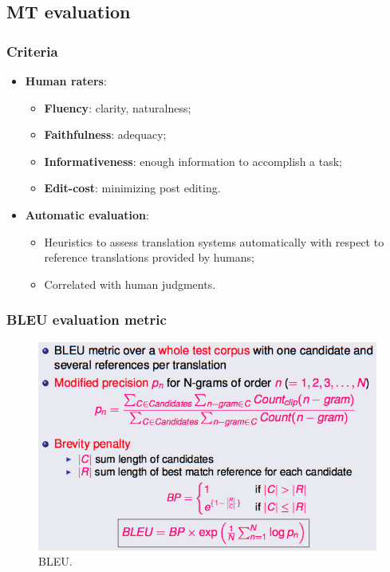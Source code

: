\subsection{MT evaluation}

\subsubsection{Criteria}

\begin{itemize}
	\item \textbf{Human raters}:
	\begin{itemize}
		\item \textbf{Fluency}: clarity, naturalness;
		\item \textbf{Faithfulness}: adequacy;
		\item \textbf{Informativeness}: enough information to accomplish a task;
		\item \textbf{Edit-cost}: minimizing post editing.
	\end{itemize}
	\item \textbf{Automatic evaluation}:
	\begin{itemize}
		\item Heuristics to assess translation systems automatically with respect to reference translations provided by humans;
		\item Correlated with human judgments.
	\end{itemize}
\end{itemize}

\subsubsection{BLEU evaluation metric}

\begin{figure}[htp]
	\centering
	\includegraphics[scale=0.6]{images/67_bleu.png}
 	\caption{BLEU.}
\end{figure}

